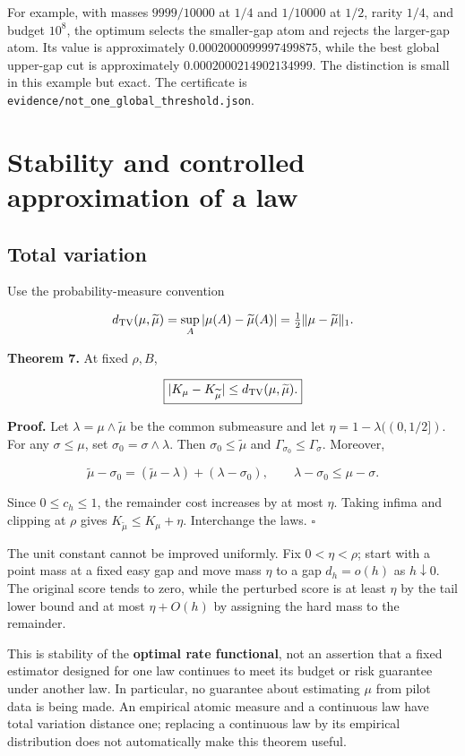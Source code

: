 \documentclass[
  11pt,
  a4paper,
]{article}
\begin{document}
For example, with masses \(9999/10000\) at \(1/4\) and \(1/10000\) at
\(1/2\), rarity \(1/4\), and budget \(10^8\), the optimum selects the
smaller-gap atom and rejects the larger-gap atom. Its value is
approximately \(0.0002000099997499875\), while the best global upper-gap
cut is approximately \(0.0002000214902134999\). The distinction is small
in this example but exact. The certificate is
\texttt{evidence/not\_one\_global\_threshold.json}.

\section{Stability and controlled approximation of a
law}\label{stability-and-controlled-approximation-of-a-law}

\subsection{Total variation}\label{total-variation}

Use the probability-measure convention

\[
d_{\rm TV}(\mu,\widetilde\mu)
=\sup_A|\mu(A)-\widetilde\mu(A)|
=\tfrac12\|\mu-\widetilde\mu\|_1.
\]

\textbf{Theorem 7.} At fixed \(\rho,B\),

\[
\boxed{|K_\mu-K_{\widetilde\mu}|\le d_{\rm TV}(\mu,\widetilde\mu).}
\]

\textbf{Proof.} Let \(\lambda=\mu\wedge\widetilde\mu\) be the common
submeasure and let \(\eta=1-\lambda((0,1/2])\). For any
\(\sigma\le\mu\), set \(\sigma_0=\sigma\wedge\lambda\). Then
\(\sigma_0\le\widetilde\mu\) and \(\Gamma_{\sigma_0}\le\Gamma_\sigma\).
Moreover,

\[
\widetilde\mu-\sigma_0
=(\widetilde\mu-\lambda)+(\lambda-\sigma_0),
\qquad \lambda-\sigma_0\le\mu-\sigma.
\]

Since \(0\le c_h\le1\), the remainder cost increases by at most
\(\eta\). Taking infima and clipping at \(\rho\) gives
\(K_{\widetilde\mu}\le K_\mu+\eta\). Interchange the laws. \(\square\)

The unit constant cannot be improved uniformly. Fix \(0<\eta<\rho\);
start with a point mass at a fixed easy gap and move mass \(\eta\) to a
gap \(d_h=o(h)\) as \(h\downarrow0\). The original score tends to zero,
while the perturbed score is at least \(\eta\) by the tail lower bound
and at most \(\eta+O(h)\) by assigning the hard mass to the remainder.

This is stability of the \textbf{optimal rate functional}, not an
assertion that a fixed estimator designed for one law continues to meet
its budget or risk guarantee under another law. In particular, no
guarantee about estimating \(\mu\) from pilot data is being made. An
empirical atomic measure and a continuous law have total variation
distance one; replacing a continuous law by its empirical distribution
does not automatically make this theorem useful.
\end{document}
